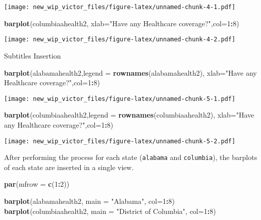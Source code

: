 \documentclass[]{article}
\newenvironment{Shaded}{\begin{snugshade}}{\end{snugshade}}
\newcommand{\DataTypeTok}[1]{\textcolor[rgb]{0.13,0.29,0.53}{#1}}
\newcommand{\DecValTok}[1]{\textcolor[rgb]{0.00,0.00,0.81}{#1}}
\newcommand{\KeywordTok}[1]{\textcolor[rgb]{0.13,0.29,0.53}{\textbf{#1}}}
\newcommand{\NormalTok}[1]{#1}
\newcommand{\OperatorTok}[1]{\textcolor[rgb]{0.81,0.36,0.00}{\textbf{#1}}}
\newcommand{\StringTok}[1]{\textcolor[rgb]{0.31,0.60,0.02}{#1}}
\begin{document}
\texttt{[image: new\_wip\_victor\_files/figure-latex/unnamed-chunk-4-1.pdf]}

\begin{Shaded}
\begin{Highlighting}[]
\KeywordTok{barplot}\NormalTok{(columbiaahealth2, }\DataTypeTok{xlab=}\StringTok{"Have any Healthcare coverage?"}\NormalTok{,}\DataTypeTok{col=}\DecValTok{1}\OperatorTok{:}\DecValTok{8}\NormalTok{)}
\end{Highlighting}
\end{Shaded}

\texttt{[image: new\_wip\_victor\_files/figure-latex/unnamed-chunk-4-2.pdf]}

Subtitles Insertion

\begin{Shaded}
\begin{Highlighting}[]
\KeywordTok{barplot}\NormalTok{(alabamahealth2,}\DataTypeTok{legend =} \KeywordTok{rownames}\NormalTok{(alabamahealth2), }\DataTypeTok{xlab=}\StringTok{"Have any Healthcare coverage?"}\NormalTok{,}\DataTypeTok{col=}\DecValTok{1}\OperatorTok{:}\DecValTok{8}\NormalTok{) }
\end{Highlighting}
\end{Shaded}

\texttt{[image: new\_wip\_victor\_files/figure-latex/unnamed-chunk-5-1.pdf]}

\begin{Shaded}
\begin{Highlighting}[]
\KeywordTok{barplot}\NormalTok{(columbiaahealth2,}\DataTypeTok{legend =} \KeywordTok{rownames}\NormalTok{(columbiaahealth2), }\DataTypeTok{xlab=}\StringTok{"Have any Healthcare coverage?"}\NormalTok{,}\DataTypeTok{col=}\DecValTok{1}\OperatorTok{:}\DecValTok{8}\NormalTok{)}
\end{Highlighting}
\end{Shaded}

\texttt{[image: new\_wip\_victor\_files/figure-latex/unnamed-chunk-5-2.pdf]}

After performing the process for each state (\texttt{alabama} and
\texttt{columbia}), the barplots of each state are inserted in a single
view.

\begin{Shaded}
\begin{Highlighting}[]
\KeywordTok{par}\NormalTok{(}\DataTypeTok{mfrow =} \KeywordTok{c}\NormalTok{(}\DecValTok{1}\OperatorTok{:}\DecValTok{2}\NormalTok{))}

\KeywordTok{barplot}\NormalTok{(alabamahealth2, }\DataTypeTok{main =} \StringTok{"Alabama"}\NormalTok{, }\DataTypeTok{col=}\DecValTok{1}\OperatorTok{:}\DecValTok{8}\NormalTok{) }
\KeywordTok{barplot}\NormalTok{(columbiaahealth2, }\DataTypeTok{main =} \StringTok{"District of Columbia"}\NormalTok{, }\DataTypeTok{col=}\DecValTok{1}\OperatorTok{:}\DecValTok{8}\NormalTok{)}
\end{Highlighting}
\end{Shaded}
\end{document}
